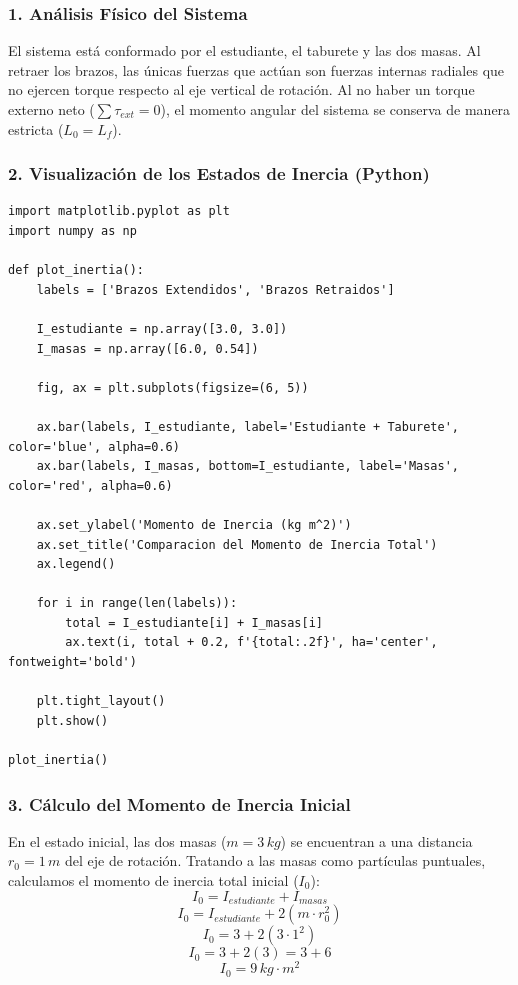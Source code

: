 \documentclass[12pt, a4paper]{article}
\begin{document}
\subsubsection*{1. Análisis Físico del Sistema}
El sistema está conformado por el estudiante, el taburete y las dos masas. Al retraer los brazos, las únicas fuerzas que actúan son fuerzas internas radiales que no ejercen torque respecto al eje vertical de rotación. Al no haber un torque externo neto ($\sum \tau_{ext} = 0$), el momento angular del sistema se conserva de manera estricta ($L_0 = L_f$).

\subsubsection*{2. Visualización de los Estados de Inercia (Python)}
\begin{lstlisting}
import matplotlib.pyplot as plt
import numpy as np

def plot_inertia():
    labels = ['Brazos Extendidos', 'Brazos Retraidos']
    
    I_estudiante = np.array([3.0, 3.0])
    I_masas = np.array([6.0, 0.54])
    
    fig, ax = plt.subplots(figsize=(6, 5))
    
    ax.bar(labels, I_estudiante, label='Estudiante + Taburete', color='blue', alpha=0.6)
    ax.bar(labels, I_masas, bottom=I_estudiante, label='Masas', color='red', alpha=0.6)
    
    ax.set_ylabel('Momento de Inercia (kg m^2)')
    ax.set_title('Comparacion del Momento de Inercia Total')
    ax.legend()
    
    for i in range(len(labels)):
        total = I_estudiante[i] + I_masas[i]
        ax.text(i, total + 0.2, f'{total:.2f}', ha='center', fontweight='bold')
        
    plt.tight_layout()
    plt.show()

plot_inertia()
\end{lstlisting}

\subsubsection*{3. Cálculo del Momento de Inercia Inicial}
En el estado inicial, las dos masas ($m = 3 \, \si{kg}$) se encuentran a una distancia $r_0 = 1 \, \si{m}$ del eje de rotación. Tratando a las masas como partículas puntuales, calculamos el momento de inercia total inicial ($I_0$):
$$I_0 = I_{estudiante} + I_{masas}$$
$$I_0 = I_{estudiante} + 2 (m \cdot r_0^2)$$
$$I_0 = 3 + 2 (3 \cdot 1^2)$$
$$I_0 = 3 + 2 (3) = 3 + 6$$
$$I_0 = 9 \, \si{kg\cdot m^2}$$
\end{document}
